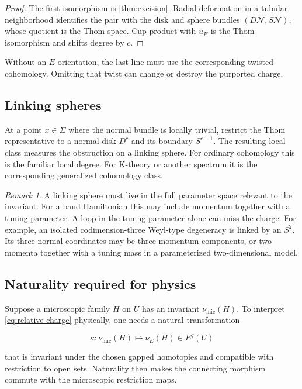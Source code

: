 \documentclass[12pt]{article}
\theoremstyle{definition}
\theoremstyle{remark}
\newtheorem{remark}[theorem]{Remark}
\begin{document}
\begin{proof}
The first isomorphism is \cref{thm:excision}.  Radial deformation in a
tubular neighborhood identifies the pair with the disk and sphere bundles
$(D\mathcal N,S\mathcal N)$, whose quotient is the Thom space.  Cup product
with $u_E$ is the Thom isomorphism and shifts degree by $c$.
\end{proof}

Without an $E$-orientation, the last line must use the corresponding twisted
cohomology.  Omitting that twist can change or destroy the purported charge.

\subsection{Linking spheres}

At a point $x\in\Sigma$ where the normal bundle is locally trivial, restrict
the Thom representative to a normal disk $D^c$ and its boundary $S^{c-1}$.
The resulting local class measures the obstruction on a linking sphere.
For ordinary cohomology this is the familiar local degree.  For K-theory or
another spectrum it is the corresponding generalized cohomology class.

\begin{remark}
A linking sphere must live in the full parameter space relevant to the
invariant.  For a band Hamiltonian this may include momentum together with a
tuning parameter.  A loop in the tuning parameter alone can miss the charge.
For example, an isolated codimension-three Weyl-type degeneracy is linked by
an $S^2$.  Its three normal coordinates may be three momentum components, or
two momenta together with a tuning mass in a parameterized two-dimensional
model.
\end{remark}

\subsection{Naturality required for physics}

Suppose a microscopic family $H$ on $U$ has an invariant
$\nu_{\mathrm{mic}}(H)$.  To interpret \cref{eq:relative-charge} physically,
one needs a natural transformation

\begin{equation}
  \kappa:\nu_{\mathrm{mic}}(H)\longmapsto \nu_E(H)\in E^q(U)
  \label{eq:comparison-map}
\end{equation}

that is invariant under the chosen gapped homotopies and compatible with
restriction to open sets.  Naturality then makes the connecting morphism
commute with the microscopic restriction maps.
\end{document}
